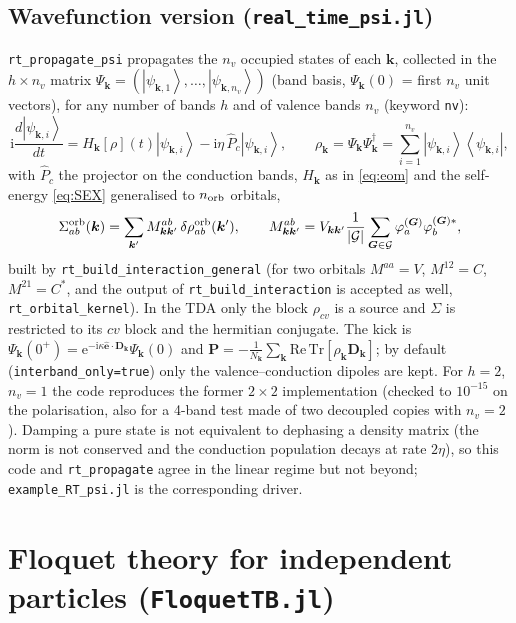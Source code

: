 \documentclass[11pt,a4paper]{article}
\newcommand{\ii}{\mathrm{i}}
\newcommand{\ee}{\mathrm{e}}
\newcommand{\kk}{\bm{k}}
\newcommand{\GG}{\bm{G}}
\newcommand{\hate}{\hat{\bm{e}}}
\newcommand{\ket}[1]{\left|#1\right\rangle}
\newcommand{\bra}[1]{\left\langle#1\right|}
\newcommand{\code}[1]{\texttt{#1}}
\newcommand{\Nk}{N_{\bm k}}
\begin{document}
\subsection{Wavefunction version (\code{real\_time\_psi.jl})}
\code{rt\_propagate\_psi} propagates the $n_v$ occupied states of each $\kk$, collected in the $h\times n_v$ matrix
$\Psi_{\kk}=(\ket{\psi_{\kk,1}},\dots,\ket{\psi_{\kk,n_v}})$ (band basis, $\Psi_{\kk}(0)$ = first $n_v$ unit vectors), for any number of bands $h$
and of valence bands $n_v$ (keyword \code{nv}):
\begin{equation}
\ii\frac{d\ket{\psi_{\kk,i}}}{dt}=H_{\kk}[\rho](t)\ket{\psi_{\kk,i}}-\ii\eta\,\hat P_c\ket{\psi_{\kk,i}},\qquad
\rho_{\kk}=\Psi_{\kk}\Psi_{\kk}^\dagger=\sum_{i=1}^{n_v}\ket{\psi_{\kk,i}}\bra{\psi_{\kk,i}},
\end{equation}
with $\hat P_c$ the projector on the conduction bands, $H_{\kk}$ as in \eqref{eq:eom} and the self-energy \eqref{eq:SEX} generalised to $n_{\rm orb}$ orbitals,
\begin{equation}
\Sigma^{\rm orb}_{ab}(\kk)=\sum_{\kk'}M^{ab}_{\kk\kk'}\,\delta\rho^{\rm orb}_{ab}(\kk'),\qquad
M^{ab}_{\kk\kk'}=V_{\kk\kk'}\frac{1}{|\mathcal G|}\sum_{\GG\in\mathcal G}\varphi^{(\GG)}_a\varphi^{(\GG)*}_b ,
\end{equation}
built by \code{rt\_build\_interaction\_general} (for two orbitals $M^{aa}=V$, $M^{12}=C$, $M^{21}=C^*$, and the output of
\code{rt\_build\_interaction} is accepted as well, \code{rt\_orbital\_kernel}). In the TDA only the block $\rho_{cv}$ is a source and
$\Sigma$ is restricted to its $cv$ block and the hermitian conjugate. The kick is $\Psi_{\kk}(0^+)=\ee^{-\ii\kappa\hate\cdot\bm D_{\kk}}\Psi_{\kk}(0)$ and
$\bm P=-\frac{1}{\Nk}\sum_{\kk}\mathrm{Re}\,\mathrm{Tr}[\rho_{\kk}\bm D_{\kk}]$; by default (\code{interband\_only=true}) only the valence--conduction
dipoles are kept. For $h=2$, $n_v=1$ the code reproduces the former $2\times2$ implementation (checked to $10^{-15}$ on the polarisation, also for a
4-band test made of two decoupled copies with $n_v=2$). Damping a pure state is not equivalent to dephasing a density matrix (the norm is not
conserved and the conduction population decays at rate $2\eta$), so this code and \code{rt\_propagate} agree in the linear regime but not beyond;
\code{example\_RT\_psi.jl} is the corresponding driver.

\section{Floquet theory for independent particles (\code{FloquetTB.jl})}
\label{sec:floquet}
\end{document}
